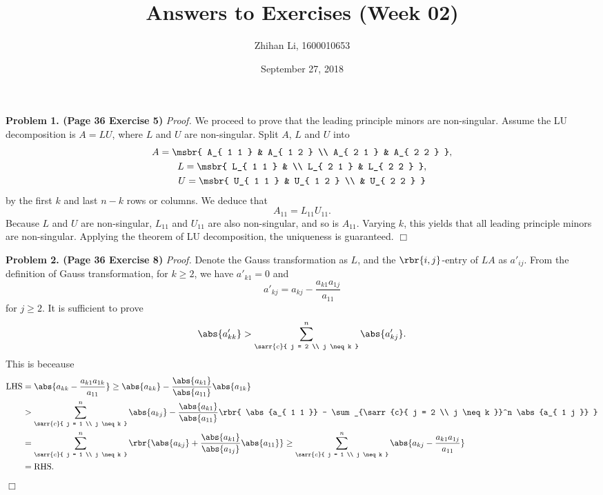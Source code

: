 \documentclass[english, nochinese]{pnote}
\title{Answers to Exercises (Week 02)}
\author{Zhihan Li, 1600010653}
\date{September 27, 2018}
\begin{document}
\maketitle

\textbf{Problem 1. (Page 36 Exercise 5)} \textit{Proof.} We proceed to prove that the leading principle minors are non-singular. Assume the LU decomposition is $ A = L U $, where $L$ and $U$ are non-singular. Split $A$, $L$ and $U$ into
\begin{gather}
A = \msbr{ A_{ 1 1 } & A_{ 1 2 } \\ A_{ 2 1 } & A_{ 2 2 } }, \\
L = \msbr{ L_{ 1 1 } & \\ L_{ 2 1 } & L_{ 2 2 } }, \\
U = \msbr{ U_{ 1 1 } & U_{ 1 2 } \\ & U_{ 2 2 } }
\end{gather}
by the first $k$ and last $ n - k $ rows or columns. We deduce that
\begin{equation}
A_{ 1 1 } = L_{ 1 1 } U_{ 1 1 }.
\end{equation}
Because $L$ and $U$ are non-singular, $ L_{ 1 1 } $ and $ U_{ 1 1 } $ are also non-singular, and so is $ A_{ 1 1 } $. Varying $k$, this yields that all leading principle minors are non-singular. Applying the theorem of LU decomposition, the uniqueness is guaranteed.
\hfill$\Box$

\textbf{Problem 2. (Page 36 Exercise 8)} \textit{Proof.} Denote the Gauss transformation as $L$, and the $ \rbr{ i, j } $-entry of $ L A $ as $ a'_{ i j } $. From the definition of Gauss transformation, for $ k \ge 2 $, we have $ a'_{ k 1 } = 0 $ and
\begin{equation}
a'_{ k j } = a_{ k j } - \frac{ a_{ k 1 } a_{ 1 j } }{a_{ 1 1 }}
\end{equation}
for $ j \ge 2 $.
It is sufficient to prove
\begin{equation}
\abs{a'_{ k k }} > \sum_{\sarr{c}{ j = 2 \\ j \neq k }}^n \abs{a'_{ k j }}.
\end{equation}
This is beceause
\begin{equation}
\begin{split}
\text{LHS} &= \abs{ a_{ k k } - \frac{ a_{ k 1 } a_{ 1 k } }{a_{ 1 1 }} } \ge \abs{a_{ k k }} - \frac{\abs{a_{ k 1 }}}{\abs{a_{ 1 1 }}} \abs{a_{ 1 k }} \\
&> \sum_{\sarr{c}{ j = 1 \\ j \neq k }}^n \abs{a_{ k j }} - \frac{\abs{a_{ k 1 }}}{\abs{a_{ 1 1 }}} \rbr{ \abs{a_{ 1 1 }} - \sum_{\sarr{c}{ j = 2 \\ j \neq k }}^n \abs{a_{ 1 j }} } \\
&= \sum_{\sarr{c}{ j = 1 \\ j \neq k }}^n \rbr{ \abs{a_{ k j }} + \frac{\abs{a_{ k 1 }}}{\abs{a_{ 1 j }}} \abs{a_{ 1 1 }} } \ge \sum_{\sarr{c}{ j = 1 \\ j \neq k }}^n \abs{ a_{ k j } - \frac{ a_{ k 1 } a_{ 1 j } }{a_{ 1 1 }} } \\
&= \text{RHS}.
\end{split}
\end{equation}
\hfill$\Box$
\end{document}

